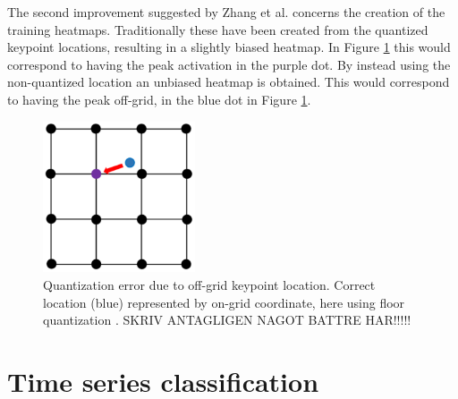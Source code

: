 The second improvement suggested by Zhang et al. concerns the creation of the training heatmaps. Traditionally these have been created from the quantized keypoint locations, resulting in a slightly biased heatmap. In Figure \ref{fig:pixel-quantization} this would correspond to having the peak activation in the purple dot. By instead using the non-quantized location an unbiased heatmap is obtained. This would correspond to having the peak off-grid, in the blue dot in Figure \ref{fig:pixel-quantization}.

\begin{figure}
  \centering
  \includegraphics[width=0.4\textwidth]{files/figs/quantization.png}
  \caption{Quantization error due to off-grid keypoint location. Correct location (blue) represented by on-grid coordinate, here using floor quantization \cite{Zhang2020}. SKRIV ANTAGLIGEN NAGOT BATTRE HAR!!!!!}
  \label{fig:pixel-quantization}
\end{figure}


\section{Time series classification}
\cite{IsmailFawaz2019}

